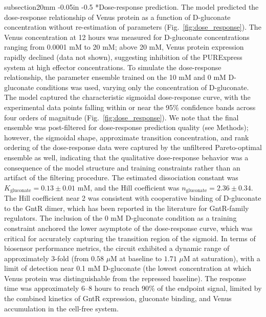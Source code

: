 \documentclass[12pt]{article}
\makeatletter
\renewcommand\subsection{\@startsection
	{subsection}{2}{0mm}
	{-0.05in}
	{-0.5\baselineskip}
	{\normalfont\normalsize\bfseries}}
\makeatother
\begin{document}
\subsection*{Dose-response prediction.}
The model predicted the dose-response relationship of Venus protein as a function of D-gluconate concentration without re-estimation of parameters (Fig.~\ref{fig:dose_response}). The Venus concentration at 12 hours was measured for D-gluconate concentrations ranging from 0.0001 mM to 20 mM; above 20 mM, Venus protein expression rapidly declined (data not shown), suggesting inhibition of the PURExpress system at high effector concentrations. To simulate the dose-response relationship, the parameter ensemble trained on the 10 mM and 0 mM D-gluconate conditions was used, varying only the concentration of D-gluconate. The model captured the characteristic sigmoidal dose-response curve, with the experimental data points falling within or near the 95\% confidence bands across four orders of magnitude (Fig.~\ref{fig:dose_response}). We note that the final ensemble was post-filtered for dose-response prediction quality (see Methods); however, the sigmoidal shape, approximate transition concentration, and rank ordering of the dose-response data were captured by the unfiltered Pareto-optimal ensemble as well, indicating that the qualitative dose-response behavior was a consequence of the model structure and training constraints rather than an artifact of the filtering procedure. The estimated dissociation constant was $K_{\text{gluconate}} = 0.13 \pm 0.01$ mM, and the Hill coefficient was $n_{\text{gluconate}} = 2.36 \pm 0.34$. The Hill coefficient near 2 was consistent with cooperative binding of D-gluconate to the GntR dimer, which has been reported in the literature for GntR-family regulators. The inclusion of the 0 mM D-gluconate condition as a training constraint anchored the lower asymptote of the dose-response curve, which was critical for accurately capturing the transition region of the sigmoid. In terms of biosensor performance metrics, the circuit exhibited a dynamic range of approximately 3-fold (from $0.58$ $\mu$M at baseline to $1.71$ $\mu$M at saturation), with a limit of detection near 0.1 mM D-gluconate (the lowest concentration at which Venus protein was distinguishable from the repressed baseline). The response time was approximately 6--8 hours to reach 90\% of the endpoint signal, limited by the combined kinetics of GntR expression, gluconate binding, and Venus accumulation in the cell-free system.
\end{document}
